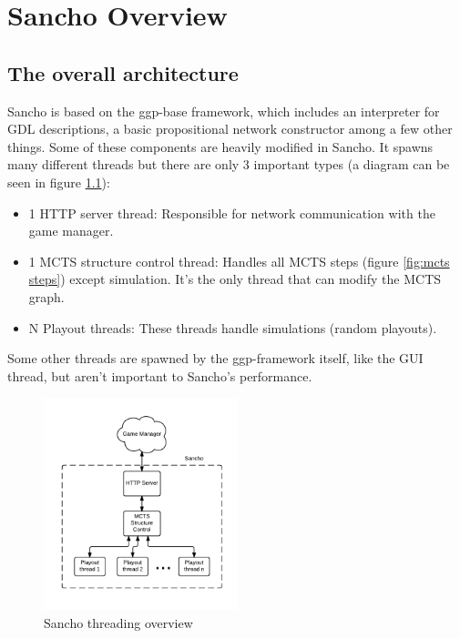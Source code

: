
\chapter{Sancho Overview}
\label{chapter:sancho_overview}

\section{The overall architecture}

Sancho is based on the ggp-base framework, which includes an interpreter for GDL descriptions, a basic propositional network constructor among a few other things. Some of these components are heavily modified in Sancho.
It spawns many different threads but there are only 3 important types (a diagram can be seen in figure \ref{fig:sancho_overview}):

\begin{itemize}
	\item 1 HTTP server thread: Responsible for network communication with the game manager.
	\item 1 MCTS structure control thread: Handles all MCTS steps (figure \ref{fig:mcts steps}) except simulation. It's the only thread that can modify the MCTS graph.
	\item N Playout threads: These threads handle simulations (random playouts).    
\end{itemize}

Some other threads are spawned by the ggp-framework itself, like the GUI thread, but aren't important to Sancho's performance.

\begin{figure}[h]
	\centering
	\includegraphics[width=0.5\textwidth]{images/Sancho_overview.pdf}
	\caption{Sancho threading overview}
	\label{fig:sancho_overview}
\end{figure}

